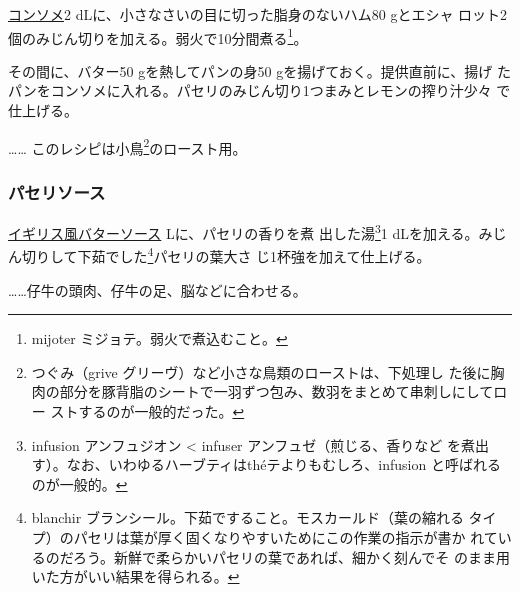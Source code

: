 \begin{recette}
\protect\hyperlink{}{コンソメ}2
dLに、小さなさいの目に切った脂身のないハム80 gとエシャ
ロット2個のみじん切りを加える。弱火で10分間煮る\footnote{mijoter
  ミジョテ。弱火で煮込むこと。}。

その間に、バター50 gを熱してパンの身50 gを揚げておく。提供直前に、揚げ
たパンをコンソメに入れる。パセリのみじん切り1つまみとレモンの搾り汁少々
で仕上げる。

\ldots{}\ldots{} このレシピは小鳥\footnote{つぐみ（grive
  グリーヴ）など小さな鳥類のローストは、下処理し
  た後に胸肉の部分を豚背脂のシートで一羽ずつ包み、数羽をまとめて串刺しにしてロー
  ストするのが一般的だった。}のロースト用。

\maeaki

\hypertarget{perseley-sauce}{%
\subsubsection{パセリソース}\label{perseley-sauce}}



\protect\hyperlink{bread-sauce}{イギリス風バターソース}\undemi{}
Lに、パセリの香りを煮 出した湯\footnote{infusion アンフュジオン
  \textless{} infuser アンフュゼ（煎じる、香りなど
  を煮出す）。なお、いわゆるハーブティはthéテよりもむしろ、infusion
  と呼ばれるのが一般的。}1
dLを加える。みじん切りして下茹でした\footnote{blanchir
  ブランシール。下茹ですること。モスカールド（葉の縮れる
  タイプ）のパセリは葉が厚く固くなりやすいためにこの作業の指示が書か
  れているのだろう。新鮮で柔らかいパセリの葉であれば、細かく刻んでそ
  のまま用いた方がいい結果を得られる。}パセリの葉大さ
じ1杯強を加えて仕上げる。

\ldots{}\ldots{}仔牛の頭肉、仔牛の足、脳などに合わせる。

\maeaki

\hypertarget{ux9b5aux6599ux7406ux7528ux30d1ux30bbux30eaux30bdux30fcux30b945bis}{%
}
\end{recette}
